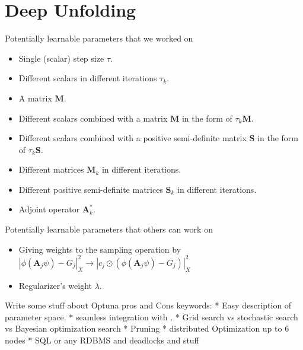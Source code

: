 \chapter{Deep Unfolding}

Potentially learnable parameters that we worked on\\
\begin{itemize}
  \item Single (scalar) step size $\tau$.
  \item Different scalars in different iterations $\tau_k$.
  \item A matrix $\boldsymbol{M}$.
  \item Different scalars combined with a matrix $\boldsymbol{M}$ in the form of $\tau_k \boldsymbol{M}$.
  \item Different scalars combined with a positive semi-definite matrix $\boldsymbol{S}$ in the form of $\tau_k \boldsymbol{S}$.
  \item Different matrices $\boldsymbol{M}_k$ in different iterations.
  \item Different positive semi-definite matrices $\boldsymbol{S}_k$ in different iterations.
  \item Adjoint operator $\boldsymbol{A}_k^*$.  
\end{itemize}

Potentially learnable parameters that others can work on\\
\begin{itemize}
  \item Giving weights to the sampling operation by $\left|\phi(\boldsymbol{A}_j\psi)-G_j\right|_X^2 \rightarrow \left|c_j \odot \left(\phi(\boldsymbol{A}_j\psi)-G_j\right)\right|_X^2$
  \item Regularizer's weight $\lambda$.
\end{itemize}





Write some stuff about Optuna pros and Cons
keywords:
* Easy description of parameter space.
* seamless integration with \pytorch. 
* Grid search vs stochastic search vs Bayesian optimization search
* Pruning 
* distributed Optimization up to 6 nodes
* \ac{SQL} or any \ac{RDBMS} and deadlocks and stuff